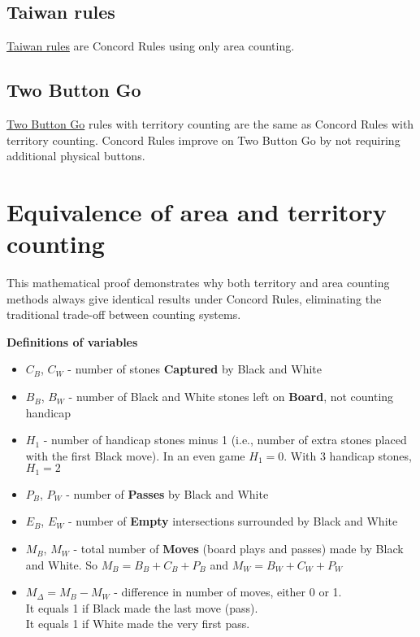 \documentclass[11pt]{article}
\begin{document}
\subsection*{Taiwan rules}
\href{https://senseis.xmp.net/?TaiwanRules}{Taiwan rules} are Concord Rules using only area counting.

\subsection*{Two Button Go}
\href{https://senseis.xmp.net/?TwoButtonGo}{Two Button Go} rules with territory counting are the same as Concord Rules with territory counting.
Concord Rules improve on Two Button Go by not requiring additional physical buttons.


\newpage
\section*{Equivalence of area and territory counting}

This mathematical proof demonstrates why both territory and area counting methods always give identical results under Concord Rules, eliminating the traditional trade-off between counting systems.

\textbf{Definitions of variables}

\begin{itemize}
\item $C_B$, $C_W$ - number of stones \textbf{Captured} by Black and White
\item $B_B$, $B_W$ - number of Black and White stones left on \textbf{Board}, not counting handicap
\item $H_1$ - number of handicap stones minus 1 (i.e., number of extra stones placed with the first Black move).
In an even game $H_1 = 0$. With 3 handicap stones, $H_1 = 2$
\item $P_B$, $P_W$ - number of \textbf{Passes} by Black and White
\item $E_B$, $E_W$ - number of \textbf{Empty} intersections surrounded by Black and White
\item $M_B$, $M_W$ - total number of \textbf{Moves} (board plays and passes) made by Black and White.
So $M_B = B_B + C_B + P_B$ and $M_W = B_W + C_W + P_W$
\item $M_\Delta = M_B - M_W$ - difference in number of moves, either 0 or 1. \\
It equals 1 if Black made the last move (pass).\\
It equals 1 if White made the very first pass.
\end{itemize}
\end{document}
